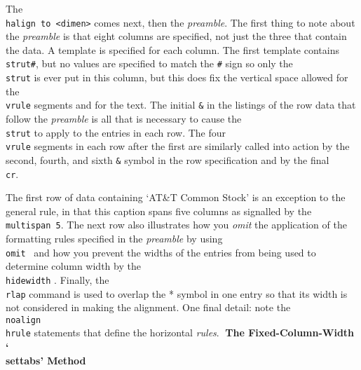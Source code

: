 The {\tt \\halign to <dimen>} comes next, then the {\sl preamble}.  The
first thing to note about the {\sl preamble} is that
eight columns are specified, not just the three that contain the data.
A template is specified for each column. The first template
contains  {\tt \\strut\#}, but no values are
specified to match the {\tt \#} sign so only the {\tt \\strut} is ever put in
this column, but this does fix the vertical space allowed for the {\tt
\\vrule} segments and for the text.  The initial {\tt \&} in the listings
of the row data that follow the {\sl preamble} is all that is necessary to
cause the {\tt \\strut} to apply to the entries in each row.  The four
{\tt \\vrule} segments in each row after the first are similarly called
into action by the second, fourth, and sixth {\tt \&} symbol in
the row specification and by the final {\tt \\cr}.

The first row of data containing `AT\&T Common Stock' is an
exception to the general rule, in that this caption spans five columns as
signalled by the \cs\/\ {\tt \\multispan 5}.  The next row also
illustrates how you {\sl omit} the application of the formatting rules
specified in the {\sl preamble} by using {\tt \\omit} \cs\/\ and how you
prevent the widths of the entries from being used to determine column
width by the {\tt \\hidewidth} \css.  Finally, the {\tt \\rlap} command is
used to overlap the * symbol in one entry so that its width is not
considered in making the alignment.  One final detail: note the {\tt
\\noalign\lbr\\hrule\rbr} statements that define the horizontal {\sl
rules}.
{\bf The Fixed-Column-Width `\\settabs' Method}

